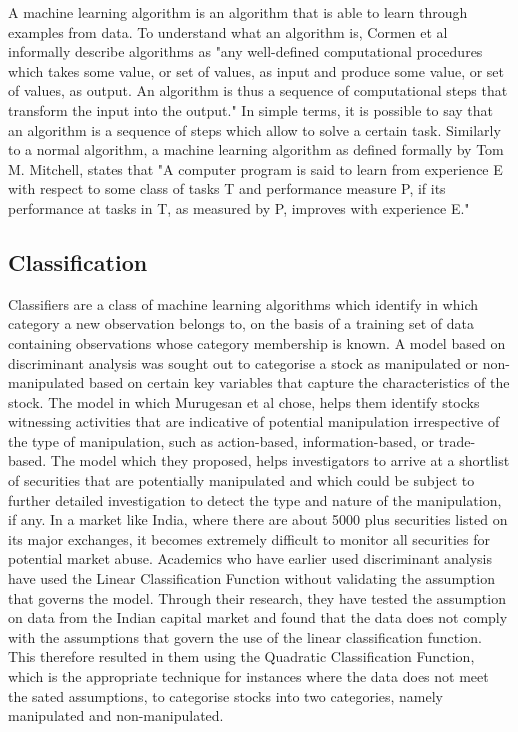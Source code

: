 A machine learning algorithm is an algorithm that is able to learn through examples from data. To understand what an algorithm is, Cormen et al informally describe algorithms as "any well-defined computational procedures which takes some value, or set of values, as input and produce some value, or set of values, as output. An algorithm is thus a sequence of computational steps that transform the input into the output."\cite{Cormen:2009aa} In simple terms, it is possible to say that an algorithm is a sequence of steps which allow to solve a certain task. Similarly to a normal algorithm, a machine learning algorithm as defined formally by Tom M. Mitchell, states that "A computer program is said to learn from experience E with respect to some class of tasks T and performance measure P, if its performance at tasks in T, as measured by P, improves with experience E."\cite{Mitchell:1997aa}

\subsection{Classification}

Classifiers are a class of machine learning algorithms which identify in which category a new observation belongs to, on the basis of a training set of data containing observations whose category membership is known. A model based on discriminant analysis was sought out to categorise a stock as manipulated or non-manipulated based on certain key variables that capture the characteristics of the stock.\cite{Murugesan:2012aa} The model in which Murugesan et al chose, helps them identify stocks witnessing activities that are indicative of potential manipulation irrespective of the type of manipulation, such as action-based, information-based, or trade-based. The model which they proposed, helps investigators to arrive at a shortlist of securities that are potentially manipulated and which could be subject to further detailed investigation to detect the type and nature of the manipulation, if any. In a market like India, where there are about 5000 plus securities listed on its major exchanges, it becomes extremely difficult to monitor all securities for potential market abuse. Academics who have earlier used discriminant analysis have used the Linear Classification Function without validating the assumption that governs the model. Through their research, they have tested the assumption on data from the Indian capital market and found that the data does not comply with the assumptions that govern the use of the linear classification function. This therefore resulted in them using the Quadratic Classification Function, which is the appropriate technique for instances where the data does not meet the sated assumptions, to categorise stocks into two categories, namely manipulated and non-manipulated.

